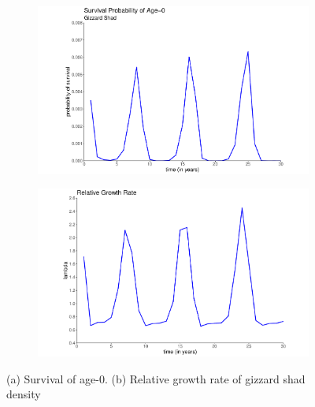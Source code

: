 \documentclass[11pt,oneside]{amsart}
\theoremstyle{definition}
\begin{document}
\begin{figure}
\centering
\begin{subfigure}[b]{.43\textwidth}
  \includegraphics[width=\textwidth]{figures/Figure2a.pdf}
   \caption{}
  \label{fig:age0time}
\end{subfigure}
\begin{subfigure}[b]{.43\textwidth}
   \includegraphics[width=\textwidth]{figures/Figure2b.pdf}
     \caption{}
\label{fig:lambda}
\end{subfigure}
\caption{(a) Survival of age-0. (b) Relative growth rate of gizzard shad density}
\end{figure}    


\end{document}
